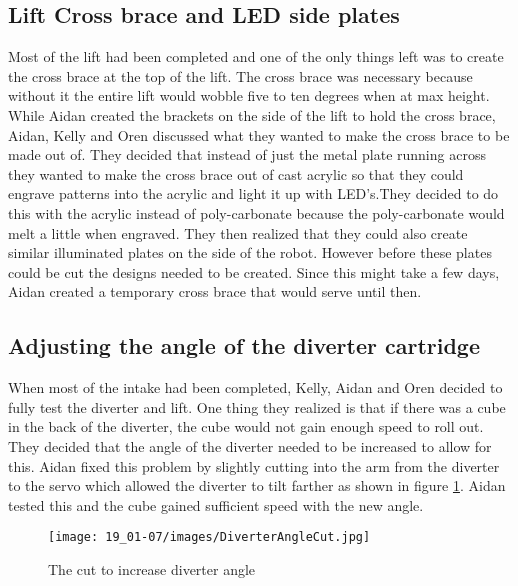 \documentclass{article}
\begin{document}
\subsection{Lift Cross brace and LED side plates}
Most of the lift had been completed and one of the only things left was to create the cross brace at the top of the lift. The cross brace was necessary because without it the entire lift would wobble five to ten degrees when at max height. While Aidan created the brackets on the side of the lift to hold the cross brace, Aidan, Kelly and Oren discussed what they wanted to make the cross brace to be made out of. They decided that instead of just the metal plate running across they wanted to make the cross brace out of cast acrylic so that they could engrave patterns into the acrylic and light it up with LED's.They decided to do this with the acrylic instead of poly-carbonate because the poly-carbonate would melt a little when engraved. They then realized that they could also create similar illuminated plates on the side of the robot. However before these plates could be cut the designs needed to be created. Since this might take a few days, Aidan created a temporary cross brace that would serve until then.

\subsection{Adjusting the angle of the diverter cartridge}
When most of the intake had been completed, Kelly, Aidan and Oren decided to fully test the diverter and lift. One thing they realized is that if there was a cube in the back of the diverter, the cube would not gain enough speed to roll out. They decided that the angle of the diverter needed to be increased to allow for this. Aidan fixed this problem by slightly cutting into the arm from the diverter to the servo which allowed the diverter to tilt farther as shown in figure \ref{fig:Cutout}. Aidan tested this and the cube gained sufficient speed with the new angle.

\begin{figure}
    \centering
    \texttt{[image: 19\_01-07/images/DiverterAngleCut.jpg]}
    \caption{The cut to increase diverter angle}
    \label{fig:Cutout}
\end{figure}
\end{document}
